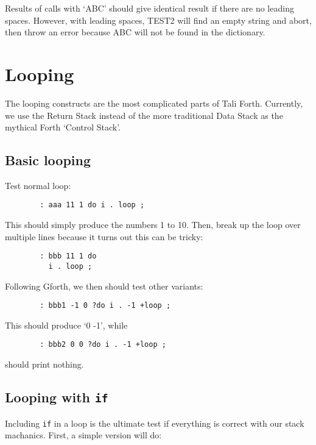 \noindent Results of calls with `ABC' should give identical result if there are no
leading spaces. However, with leading spaces, TEST2 will find an empty string
and abort, then throw an error because ABC will not be found in the dictionary.

\section{Looping}

The looping constructs are the most complicated parts of Tali Forth. Currently,
we use the Return Stack instead of the more traditional Data Stack as the
mythical Forth `Control Stack'.

\subsection{Basic looping}

Test normal loop:
\begin{lstlisting}
        : aaa 11 1 do i . loop ;        
\end{lstlisting}

\noindent This should simply produce the numbers 1 to 10. Then, break up the
loop over multiple lines because it turns out this can be tricky:

\begin{lstlisting}
        : bbb 11 1 do 
          i . loop ; 
\end{lstlisting}

\noindent Following Gforth, we then should test other variants:

\begin{lstlisting}
        : bbb1 -1 0 ?do i . -1 +loop ;
\end{lstlisting}

\noindent This should produce `0 -1', while

\begin{lstlisting}
        : bbb2 0 0 ?do i . -1 +loop ;
\end{lstlisting}

\noindent should print nothing.


\subsection{Looping with \texttt{if}}

Including \texttt{if} in a loop is the ultimate test if everything is correct
with our stack machanics. First, a simple version will do:

